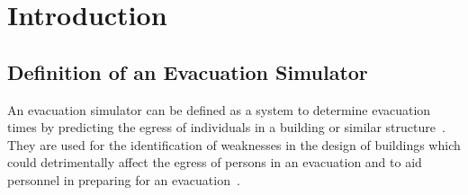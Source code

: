 

%


%

\section{Introduction}

\subsection{Definition of an Evacuation Simulator}
An evacuation simulator can be defined as a system to determine evacuation
times by predicting the egress of individuals in a building or similar
structure~\cite{evacuationSimulatordefinition}. They are used for the identification of weaknesses in the design of buildings which could detrimentally affect the egress of persons in an evacuation and to aid personnel in preparing for an evacuation~\cite{evacuationModel}.

